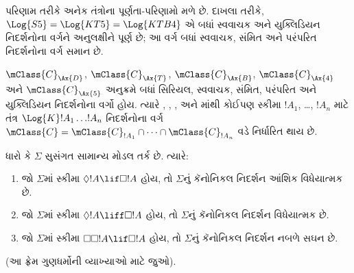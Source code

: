 પરિણામ તરીકે અનેક તંત્રોના પૂર્ણતા-પરિણામો મળે છે. દાખલા તરીકે,
$\Log{S5} = \Log{KT5} = \Log{KTB4}$ એ બધાં સ્વવાચક અને
યુક્લિડિયન નિદર્શનોના વર્ગને અનુલક્ષીને પૂર્ણ છે; આ વર્ગ બધાં
સ્વવાચક, સંમિત અને પરંપરિત નિદર્શનોના વર્ગ સમાન છે.

\begin{thm}
  $\mClass{C}_\Ax{D}$, $\mClass{C}_\Ax{T}$,
  $\mClass{C}_\Ax{B}$, $\mClass{C}_\Ax{4}$ અને
  $\mClass{C}_\Ax{5}$ અનુક્રમે બધાં સિરિયલ, સ્વવાચક,
  સંમિત, પરંપરિત અને યુક્લિડિયન નિદર્શનોના વર્ગો હોય. ત્યારે
  , , ,  અને માંથી કોઈપણ
  સ્કીમા $!A_1$, \dots, $!A_n$ માટે તંત્ર
  $\Log{K}!A_1 \dots !A_n$ નિદર્શનોના વર્ગ
  $\mClass{C} = \mClass{C}_{!A_1} \cap \dots
  \cap \mClass{C}_{!A_n}$ વડે નિર્ધારિત થાય છે.
\end{thm}

\begin{prop}
  ધારો કે $\Sigma$ સુસંગત સામાન્ય મોડલ તર્ક છે. ત્યારે:
  \begin{enumerate}
  \item{}%
    જો $\Sigma$માં સ્કીમા $\Diamond!A \lif \Box
    !A$ હોય, તો $\Sigma$નું કૅનોનિકલ નિદર્શન આંશિક વિધેયાત્મક છે.
  \item જો $\Sigma$માં સ્કીમા $\Diamond!A \liff \Box
    !A$ હોય, તો $\Sigma$નું કૅનોનિકલ નિદર્શન વિધેયાત્મક છે.
  \item જો $\Sigma$માં સ્કીમા $\Box\Box!A \lif \Box
    !A$ હોય, તો $\Sigma$નું કૅનોનિકલ નિદર્શન નબળે સઘન છે.
  \end{enumerate}
(આ ફ્રેમ ગુણધર્મોની વ્યાખ્યાઓ માટે 
  જુઓ).
\end{prop}

